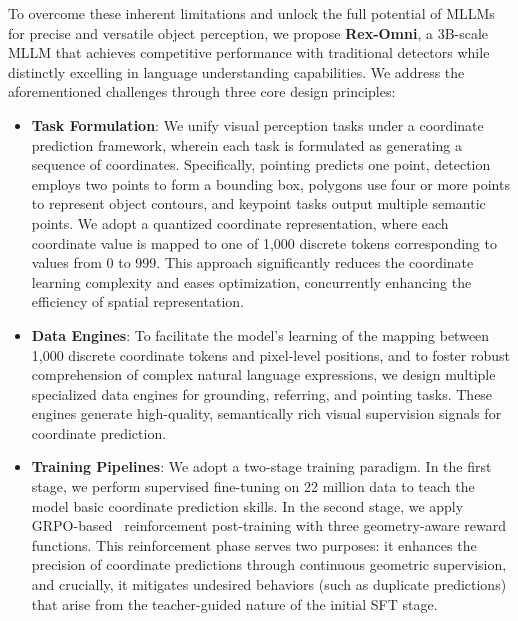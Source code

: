 To overcome these inherent limitations and unlock the full potential of MLLMs for precise and versatile object perception, we propose \textbf{Rex-Omni}, a 3B-scale MLLM that achieves competitive performance with traditional detectors while distinctly excelling in language understanding capabilities. We address the aforementioned challenges through three core design principles:
\vspace{-1em}

\begin{itemize}
    \item \textbf{Task Formulation}: We unify visual perception tasks under a coordinate prediction framework, wherein each task is formulated as generating a sequence of coordinates. Specifically, pointing predicts one point, detection employs two points to form a bounding box, polygons use four or more points to represent object contours, and keypoint tasks output multiple semantic points. We adopt a quantized coordinate representation, where each coordinate value is mapped to one of 1,000 discrete tokens corresponding to values from 0 to 999. This approach significantly reduces the coordinate learning complexity and eases optimization, concurrently enhancing the efficiency of spatial representation.

    \item \textbf{Data Engines}: To facilitate the model's learning of the mapping between 1,000 discrete coordinate tokens and pixel-level positions, and to foster robust comprehension of complex natural language expressions, we design multiple specialized data engines for grounding, referring, and pointing tasks. These engines generate high-quality, semantically rich visual supervision signals for coordinate prediction.

    \item \textbf{Training Pipelines}:  We adopt a two-stage training paradigm. In the first stage, we perform supervised fine-tuning on 22 million data to teach the model basic coordinate prediction skills. In the second stage, we apply GRPO-based~\cite{deepseekmath} reinforcement post-training with three geometry-aware reward functions. This reinforcement phase serves two purposes: it enhances the precision of coordinate predictions through continuous geometric supervision, and crucially, it mitigates undesired behaviors (such as duplicate predictions) that arise from the teacher-guided nature of the initial SFT stage.
\end{itemize}

